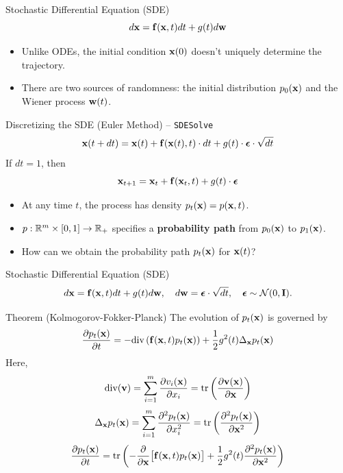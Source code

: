 \documentclass{beamer}
\begin{document}
\begin{frame}{Stochastic Differential Equation (SDE)}
	\[
		d\mathbf{x} = \mathbf{f}(\mathbf{x}, t) dt + g(t) d \mathbf{w}
	\]
	\vspace{-0.3cm}
	\begin{itemize}
		\item Unlike ODEs, the initial condition $\mathbf{x}(0)$ doesn't uniquely determine the trajectory.
		\item There are two sources of randomness: the initial distribution $p_0(\mathbf{x})$ and the Wiener process $\mathbf{w}(t)$.
	\end{itemize}
	\begin{block}{Discretizing the SDE (Euler Method) – \texttt{SDESolve}}
		\vspace{-0.3cm}
		\[
			\mathbf{x}(t + dt) = \mathbf{x}(t) + \mathbf{f}(\mathbf{x}(t), t) \cdot dt + g(t) \cdot \boldsymbol{\epsilon} \cdot \sqrt{dt}
		\]
		If $dt=1$, then
		\vspace{-0.3cm}
		\[
			\mathbf{x}_{t + 1} = \mathbf{x}_t + \mathbf{f}(\mathbf{x}_t, t) + g(t) \cdot \boldsymbol{\epsilon}
		\]
		\vspace{-0.7cm}
	\end{block}
	\begin{itemize}
		\item At any time $t$, the process has density $p_t(\mathbf{x}) = p(\mathbf{x}, t)$.
		\item $p: \mathbb{R}^m \times [0,1] \rightarrow \mathbb{R}_+$ specifies a \textbf{probability path} from $p_0(\mathbf{x})$ to $p_1(\mathbf{x})$.
		\item How can we obtain the probability path $p_t(\mathbf{x})$ for $\mathbf{x}(t)$?
	\end{itemize}
\end{frame}
\begin{frame}{Stochastic Differential Equation (SDE)}
	\vspace{-0.4cm}
	\[
		d\mathbf{x} = \mathbf{f}(\mathbf{x}, t) dt + g(t) d \mathbf{w},\quad d \mathbf{w} = \boldsymbol{\epsilon} \cdot \sqrt{dt},\quad \boldsymbol{\epsilon} \sim \mathcal{N}(0, \mathbf{I}).
	\]
	\vspace{-0.4cm}
	\begin{block}{Theorem (Kolmogorov-Fokker-Planck)}
		The evolution of $p_t(\mathbf{x})$ is governed by
		\vspace{-0.2cm}
		\[
			\frac{\partial p_t(\mathbf{x})}{\partial t} = - \text{div}\left(\mathbf{f}(\mathbf{x}, t) p_t(\mathbf{x})\right) + \frac{1}{2}g^2(t) \Delta_{\mathbf{x}}p_t(\mathbf{x})
		\]
		Here,
		\[
			\text{div} (\mathbf{v}) = \sum_{i=1}^m \frac{\partial v_i(\mathbf{x})}{\partial x_i} = \text{tr}\left( \frac{\partial \mathbf{v}(\mathbf{x})}{\partial \mathbf{x}}  \right)
		\]
		\[
			\Delta_{\mathbf{x}}p_t(\mathbf{x}) = \sum_{i=1}^m \frac{\partial^2 p_t(\mathbf{x})}{\partial x_i^2} = \text{tr}\left( \frac{\partial^2 p_t(\mathbf{x})}{\partial \mathbf{x}^2}  \right)
		\]
		\[
			\frac{\partial p_t(\mathbf{x})}{\partial t} = \text{tr}\left( - \frac{\partial}{\partial \mathbf{x}} \bigl[ \mathbf{f}(\mathbf{x}, t) p_t(\mathbf{x})\bigr] + \frac{1}{2} g^2(t) \frac{\partial^2 p_t(\mathbf{x})}{\partial \mathbf{x}^2} \right)
		\]
	\end{block}
\end{frame}
\end{document}
